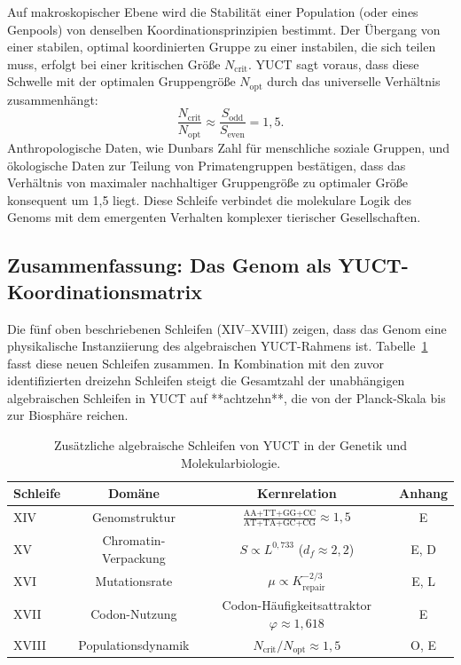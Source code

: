 \documentclass[12pt]{article}
\begin{document}
	Auf makroskopischer Ebene wird die Stabilität einer Population (oder eines Genpools) von denselben Koordinationsprinzipien bestimmt. Der Übergang von einer stabilen, optimal koordinierten Gruppe zu einer instabilen, die sich teilen muss, erfolgt bei einer kritischen Größe \(N_{\mathrm{crit}}\). YUCT sagt voraus, dass diese Schwelle mit der optimalen Gruppengröße \(N_{\mathrm{opt}}\) durch das universelle Verhältnis zusammenhängt:
	\begin{equation}
		\boxed{ \frac{N_{\mathrm{crit}}}{N_{\mathrm{opt}}} \approx \frac{S_{\mathrm{odd}}}{S_{\mathrm{even}}} = 1,5 }.
	\end{equation}
	Anthropologische Daten, wie Dunbars Zahl für menschliche soziale Gruppen, und ökologische Daten zur Teilung von Primatengruppen bestätigen, dass das Verhältnis von maximaler nachhaltiger Gruppengröße zu optimaler Größe konsequent um 1,5 liegt. Diese Schleife verbindet die molekulare Logik des Genoms mit dem emergenten Verhalten komplexer tierischer Gesellschaften.
	
	\subsection{Zusammenfassung: Das Genom als YUCT-Koordinationsmatrix}
	
	Die fünf oben beschriebenen Schleifen (XIV–XVIII) zeigen, dass das Genom eine physikalische Instanziierung des algebraischen YUCT-Rahmens ist. Tabelle~\ref{tab:genetic-loops} fasst diese neuen Schleifen zusammen. In Kombination mit den zuvor identifizierten dreizehn Schleifen steigt die Gesamtzahl der unabhängigen algebraischen Schleifen in YUCT auf **achtzehn**, die von der Planck-Skala bis zur Biosphäre reichen.
	
	\begin{table}[htbp]
		\centering
		\caption{Zusätzliche algebraische Schleifen von YUCT in der Genetik und Molekularbiologie.}
		\label{tab:genetic-loops}
		\footnotesize
		\begin{tabular}{l c c c}
			\toprule
			\textbf{Schleife} & \textbf{Domäne} & \textbf{Kernrelation} & \textbf{Anhang} \\
			\midrule
			XIV & Genomstruktur & \(\frac{\text{AA+TT+GG+CC}}{\text{AT+TA+GC+CG}} \approx 1,5\) & E \\
			XV & Chromatin-Verpackung & \(S \propto L^{0,733}\) (\(d_f \approx 2,2\)) & E, D \\
			XVI & Mutationsrate & \(\mu \propto K_{\mathrm{repair}}^{-2/3}\) & E, L \\
			XVII & Codon-Nutzung & Codon-Häufigkeitsattraktor \(\varphi \approx 1,618\) & E \\
			XVIII & Populationsdynamik & \(N_{\mathrm{crit}}/N_{\mathrm{opt}} \approx 1,5\) & O, E \\
			\bottomrule
		\end{tabular}
	\end{table}
	
\end{document}
